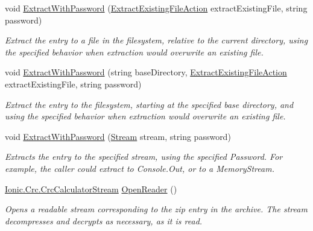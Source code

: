 \begin{DoxyCompactItemize}
void \mbox{\hyperlink{class_super_tiled2_unity_1_1_ionic_1_1_zip_1_1_zip_entry_a99571d1031642000580642b2a3028394}{Extract\+With\+Password}} (\mbox{\hyperlink{namespace_super_tiled2_unity_1_1_ionic_1_1_zip_a3f8db7242d746d36b45114257b4fe4c0}{Extract\+Existing\+File\+Action}} extract\+Existing\+File, string password)
\begin{DoxyCompactList}\small\item\em Extract the entry to a file in the filesystem, relative to the current directory, using the specified behavior when extraction would overwrite an existing file. \end{DoxyCompactList}\item 
void \mbox{\hyperlink{class_super_tiled2_unity_1_1_ionic_1_1_zip_1_1_zip_entry_af015f9309029c100d5e2fb03bb884024}{Extract\+With\+Password}} (string base\+Directory, \mbox{\hyperlink{namespace_super_tiled2_unity_1_1_ionic_1_1_zip_a3f8db7242d746d36b45114257b4fe4c0}{Extract\+Existing\+File\+Action}} extract\+Existing\+File, string password)
\begin{DoxyCompactList}\small\item\em Extract the entry to the filesystem, starting at the specified base directory, and using the specified behavior when extraction would overwrite an existing file. \end{DoxyCompactList}\item 
void \mbox{\hyperlink{class_super_tiled2_unity_1_1_ionic_1_1_zip_1_1_zip_entry_a8ac45ec7b5cb019d573436c27e97b358}{Extract\+With\+Password}} (\mbox{\hyperlink{namespace_super_tiled2_unity_1_1_ionic_1_1_zip_a9ced5352c56e7e0fceff15b534073c83aeae835e83c0494a376229f254f7d3392}{Stream}} stream, string password)
\begin{DoxyCompactList}\small\item\em Extracts the entry to the specified stream, using the specified Password. For example, the caller could extract to Console.\+Out, or to a Memory\+Stream. \end{DoxyCompactList}\item 
\mbox{\hyperlink{class_super_tiled2_unity_1_1_ionic_1_1_crc_1_1_crc_calculator_stream}{Ionic.\+Crc.\+Crc\+Calculator\+Stream}} \mbox{\hyperlink{class_super_tiled2_unity_1_1_ionic_1_1_zip_1_1_zip_entry_a825692bb86f2c5da7eefc1e9714ae18c}{Open\+Reader}} ()
\begin{DoxyCompactList}\small\item\em Opens a readable stream corresponding to the zip entry in the archive. The stream decompresses and decrypts as necessary, as it is read. \end{DoxyCompactList}\item 

\end{DoxyCompactItemize}

